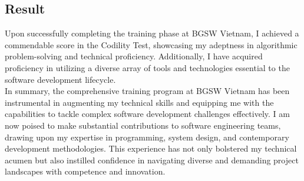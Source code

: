 \subsection{Result}
Upon successfully completing the training phase at BGSW Vietnam, I achieved a commendable score in the Codility Test, showcasing my adeptness in algorithmic problem-solving and technical proficiency. Additionally, I have acquired proficiency in utilizing a diverse array of tools and technologies essential to the software development lifecycle. \\

\noindent In summary, the comprehensive training program at BGSW Vietnam has been instrumental in augmenting my technical skills and equipping me with the capabilities to tackle complex software development challenges effectively. I am now poised to make substantial contributions to software engineering teams, drawing upon my expertise in programming, system design, and contemporary development methodologies. This experience has not only bolstered my technical acumen but also instilled confidence in navigating diverse and demanding project landscapes with competence and innovation.

